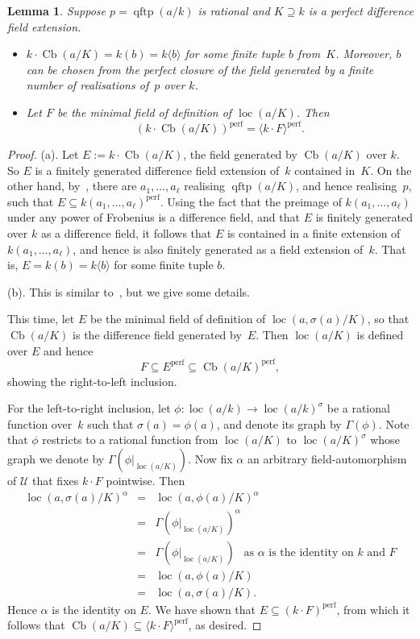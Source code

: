 \documentclass[\DocOpts]{amsart}
\newtheorem{lemma}[theorem]{Lemma}
\theoremstyle{definition}
\def\cb{\operatorname{Cb}}
\def\qftp{\operatorname{qftp}}
\def\perf{\operatorname{perf}}
\def\loc{\operatorname{loc}}
\def\U{\mathcal{U}}
\newcommand{\<}{\langle}
\renewcommand{\>}{\rangle}
\begin{document}
\begin{lemma}\label{lem:cbred}
Suppose $p=\qftp(a/k)$ is rational and $K\supseteq k$ is a perfect difference field extension.
\begin{itemize}
\item[(a)]
$k\cdot\cb(a/K)=k(b)=k\langle b\rangle$ for some finite tuple $b$ from~$K$.
Moreover, $b$ can be chosen from the perfect closure of the field generated by a finite number of realisations of~$p$ over $k$.
\item[(b)]
Let $F$ be the minimal field of definition of $\loc(a/K)$.
Then
$$(k\cdot\cb(a/K))^{\perf}=\langle k\cdot F\rangle^{\perf}.$$
\end{itemize}
\end{lemma}

\begin{proof}
(a).
Let $E:=k\cdot\cb(a/K)$, the field generated by $\cb(a/K)$ over $k$.
So $E$ is a finitely generated difference field extension of~$k$ contained in~$K$.
On the other hand, by~\cite[Lemma~2.5(c)]{qfint}, there are $a_1,\dots,a_\ell$ realising $\qftp(a/K)$, and hence realising~$p$,  such that $E\subseteq k(a_1,\dots,a_\ell)^{\perf}$.
Using the fact that the preimage of $k(a_1,\dots,a_\ell)$ under any power of Frobenius is a difference field, and that $E$ is finitely generated over $k$ as a difference field, it follows that $E$ is contained in a finite extension of $k(a_1,\dots,a_\ell)$, and hence is also finitely generated as a field extension of~$k$.
That is, $E=k(b)=k\langle b\rangle$ for some finite tuple $b$.

(b).
This is similar to~\cite[Lemma~4.5]{pillay-ziegler}, but we give some details.

This time, let $E$ be the minimal field of definition of $\loc(a,\sigma(a)/K)$, so that $\cb(a/K)$ is the difference field generated by~$E$.
Then $\loc(a/K)$ is
defined over $E$ and hence
$$F\subseteq E^{\perf}\subseteq\cb(a/K)^{\perf},$$
showing the right-to-left inclusion.

For the left-to-right inclusion, let $\phi:\loc(a/k)\to\loc(a/k)^\sigma$ be a rational function over~$k$ such that $\sigma(a)=\phi(a)$, and denote its graph by $\Gamma(\phi)$.
Note that $\phi$ restricts to a rational function from $\loc(a/K)$ to $\loc(a/K)^\sigma$ whose graph we denote by $\Gamma(\phi|_{\loc(a/K)})$.
 Now fix $\alpha$ an arbitrary field-automorphism of $\U$ that fixes $k\cdot F$ pointwise.
Then
 \begin{eqnarray*}
 \loc(a,\sigma(a)/K)^\alpha
 &=&
 \loc(a,\phi(a)/K)^\alpha\\
 &=&
 \Gamma(\phi|_{\loc(a/K)})^\alpha\\
 &=&
 \Gamma(\phi|_{\loc(a/K)})\ \ \text{ as $\alpha$ is the identity on $k$ and $F$}\\
 &=&
 \loc(a,\phi(a)/K)\\
 &=&
  \loc(a,\sigma(a)/K).
 \end{eqnarray*}
 Hence $\alpha$ is the identity on $E$.
 We have shown that $E\subseteq (k\cdot F)^{\perf}$, from which it follows that $\cb(a/K)\subseteq\langle k\cdot F\rangle^{\perf}$, as desired.
\end{proof}
\end{document}
